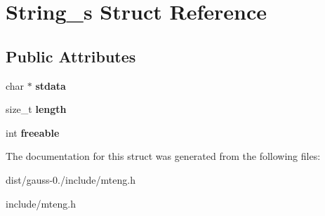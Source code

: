 \hypertarget{struct_string__s}{\section{String\-\_\-s Struct Reference}
\label{struct_string__s}
}
\subsection*{Public Attributes}
\begin{DoxyCompactItemize}
\item 
\hypertarget{struct_string__s_abf7f41ba14ed12aa21911398ef3519c4}{char $\ast$ {\bfseries stdata}}\label{struct_string__s_abf7f41ba14ed12aa21911398ef3519c4}

\item 
\hypertarget{struct_string__s_ab530c3313ebfd76f35819dd7e1abf808}{size\-\_\-t {\bfseries length}}\label{struct_string__s_ab530c3313ebfd76f35819dd7e1abf808}

\item 
\hypertarget{struct_string__s_a718034e8261b44d438d053c22acdca1f}{int {\bfseries freeable}}\label{struct_string__s_a718034e8261b44d438d053c22acdca1f}

\end{DoxyCompactItemize}


The documentation for this struct was generated from the following files\-:\begin{DoxyCompactItemize}
\item 
dist/gauss-\/0./include/mteng.\-h\item 
include/mteng.\-h\end{DoxyCompactItemize}
